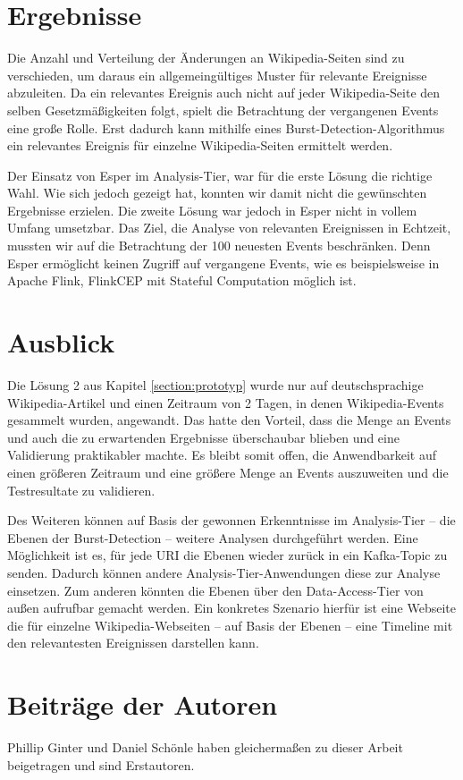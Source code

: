 \section{Ergebnisse}
Die Anzahl und Verteilung der Änderungen an Wikipedia-Seiten sind zu verschieden, um daraus ein allgemeingültiges Muster für relevante Ereignisse abzuleiten.
Da ein relevantes Ereignis auch nicht auf jeder Wikipedia-Seite den selben Gesetzmäßigkeiten folgt, spielt die Betrachtung der vergangenen Events eine große Rolle.
Erst dadurch kann mithilfe eines Burst-Detection-Algorithmus ein relevantes Ereignis für einzelne Wikipedia-Seiten ermittelt werden.

Der Einsatz von Esper im Analysis-Tier, war für die erste Lösung die richtige Wahl. Wie sich jedoch gezeigt hat, konnten wir damit
nicht die gewünschten Ergebnisse erzielen. Die zweite Lösung war jedoch in Esper nicht in vollem Umfang umsetzbar.
Das Ziel, die Analyse von relevanten Ereignissen in Echtzeit, mussten wir auf die Betrachtung der 100 neuesten Events beschränken.
Denn Esper ermöglicht keinen Zugriff auf vergangene Events, wie es beispielsweise in Apache Flink, FlinkCEP mit Stateful Computation möglich ist\cite{Friedman:2016:IAF:3126171}.

\section{Ausblick}
Die Lösung 2 aus Kapitel \ref{section:prototyp} wurde nur auf deutschsprachige Wikipedia-Artikel und einen Zeitraum von 2 Tagen, in denen Wikipedia-Events gesammelt wurden, angewandt.
Das hatte den Vorteil, dass die Menge an Events und auch die zu erwartenden Ergebnisse überschaubar blieben und eine Validierung praktikabler machte.
Es bleibt somit offen, die Anwendbarkeit auf einen größeren Zeitraum und eine größere Menge an Events auszuweiten und die Testresultate zu validieren.

Des Weiteren können auf Basis der gewonnen Erkenntnisse im Analysis-Tier -- die Ebenen der Burst-Detection -- weitere Analysen durchgeführt werden.
Eine Möglichkeit ist es, für jede URI die Ebenen wieder zurück in ein Kafka-Topic zu senden. Dadurch können andere Analysis-Tier-Anwendungen diese zur Analyse einsetzen.
Zum anderen könnten die Ebenen über den Data-Access-Tier von außen aufrufbar gemacht werden. Ein konkretes Szenario hierfür ist eine Webseite
die für einzelne Wikipedia-Webseiten -- auf Basis der Ebenen -- eine Timeline mit den relevantesten Ereignissen darstellen kann.

\section{Beiträge der Autoren}
 Phillip Ginter und Daniel Schönle haben gleichermaßen zu dieser Arbeit beigetragen und sind Erstautoren.